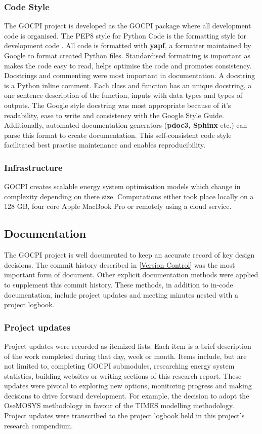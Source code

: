 \documentclass[12pt]{article}
\begin{document}
\subsubsection{Code Style}
The GOCPI project is developed as the GOCPI package where all development code is organised.
The PEP8 style for Python Code is the formatting style for development code \cite{PEP8}. 
All code is formatted with \textbf{yapf}, a formatter maintained by Google to format created Python files.
Standardised formatting is important as makes the code easy to read, helps optimise the code and promotes consistency.
Docstrings and commenting were most important in documentation. A docstring is a Python inline comment. 
Each class and function has an unique docstring, a one sentence description of the function, inputs with data types and types of outputs.
The Google style docstring was most appropriate because of it's readability, ease to write and consistency with the Google Style Guide.
Additionally, automated documentation generators (\textbf{pdoc3, Sphinx} etc.) can parse this format to create documentation.
This self-consistent code style facilitated best practise maintenance and enables reproducibility.


\subsubsection{Infrastructure}
GOCPI creates scalable energy system optimisation models which change in complexity depending on there size.
Computations either took place locally on a 128 GB, four core Apple MacBook Pro or remotely using a cloud service. 

\subsection{Documentation}
The GOCPI project is well documented to keep an accurate record of key design decisions.
The commit history described in \ref{Version Control} was the most important form of document.
Other explicit documentation methods were applied to supplement this commit history. 
These methods, in addition to in-code documentation, include project updates and meeting minutes
nested with a project logbook.

\subsubsection{Project updates}
Project updates were recorded as itemized lists.
Each item is a brief description of the work completed during that day, week or month.
Items include, but are not limited to, completing GOCPI submodules, researching energy system statistics, building websites or writing sections of this research report.
These updates were pivotal to exploring new options, monitoring progress and making decisions to drive forward development. 
For example, the decision to adopt the OseMOSYS methodology in favour of the TIMES modelling methodology.
Project updates were transcribed to the project logbook held in this project's research compendium.
\end{document}
